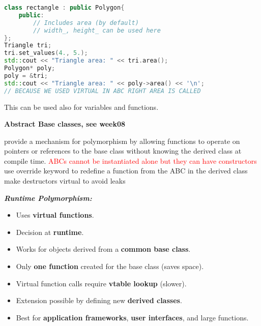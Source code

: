 \documentclass[fontsize=8pt, a4paper, landscape, fleqn]{scrartcl}
\renewcommand{\subsection}[1]{%
    \noindent\colorbox{subsectioncolor}{%
        \parbox{\dimexpr\columnwidth-2\fboxsep}{\color{white}\textbf{#1}}}%
    \vspace{0.5mm}%
}
\renewcommand{\subsubsection}[1]{%
    \noindent\textbf{\textit{\color{subsectioncolor}#1}}%
    \vspace{1mm}%
}
\begin{document}
\begin{multicols*}{3}[\raggedcolumns]
\begin{lstlisting}[language=C++, breaklines, emph={typedef}, emphstyle={\color{red}}]
class rectangle : public Polygon{
    public:
        // Includes area (by default) 
        // width_, height_ can be used here
}; 
Triangle tri;
tri.set_values(4., 5.);
std::cout << "Triangle area: " << tri.area();
Polygon* poly;
poly = &tri; 
std::cout << "Triangle area: " << poly->area() << '\n';
// BECAUSE WE USED VIRTUAL IN ABC RIGHT AREA IS CALLED
\end{lstlisting}

    This can be used also for variables and functions.

\subsection{Abstract Base classes, see week08}
provide a mechanism for polymorphism by allowing functions to operate on pointers or references to the base class without knowing the derived class at compile time.
\textcolor{red}{ABCs cannot be instantiated alone but they can have constructors}
use override keyword to redefine a function from the ABC in the derived class
make destructors virtual to avoid leaks

\subsubsection{Runtime Polymorphism:}
\begin{itemize}
    \item Uses \textbf{virtual functions}.
    \item Decision at \textbf{runtime}.
    \item Works for objects derived from a \textbf{common base class}.
    \item Only \textbf{one function} created for the base class (saves space).
    \item Virtual function calls require \textbf{vtable lookup} (slower).
    \item Extension possible by defining new \textbf{derived classes}.
    \item Best for \textbf{application frameworks}, \textbf{user interfaces}, and large functions.
\end{itemize}

\end{multicols*}
\end{document}
